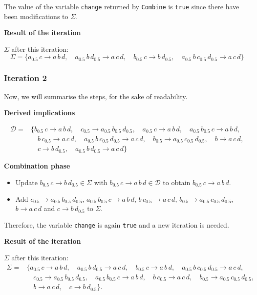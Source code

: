 \documentclass[
  letterpaper,
  DIV=11,
  numbers=noendperiod]{scrartcl}
\providecommand{\tightlist}{%
  \setlength{\itemsep}{0pt}\setlength{\parskip}{0pt}}\usepackage{longtable,booktabs,array}
\begin{document}
The value of the variable \texttt{change} returned by \texttt{Combine}
is \texttt{true} since there have been modifications to \(\Sigma\).

\textbf{Result of the iteration}

\(\Sigma\) after this iteration:
\[\Sigma = \{a_{0.5}\,c \to a\,b\,d,\quad a_{0.5}\,b\,d_{0.5} \to a\,c\,d,\quad b_{0.5}\,c \to b\,d_{0.5},\quad a_{0.5}\,b\,c_{0.5}\,d_{0.5} \to a\,c\,d\}\]

\subsubsection{Iteration 2}\label{iteration-2}

Now, we will summarise the steps, for the sake of readability.

\textbf{Derived implications}

\begin{align*}
\mathcal D = & \big\{b_{0.5}\,c \to a\,b\,d,\quad c_{0.5} \to a_{0.5}\,b_{0.5}\,d_{0.5},\quad a_{0.5}\,c \to a\,b\,d,\quad a_{0.5}\,b_{0.5}\,c \to a\,b\,d, \\
& \quad b\,c_{0.5} \to a\,c\,d,\quad a_{0.5}\,b\,c_{0.5}\,d_{0.5} \to a\,c\,d,\quad b_{0.5} \to a_{0.5}\,c_{0.5}\,d_{0.5}, \quad b \to a\,c\,d,\\
& \quad c \to b\,d_{0.5},\quad a_{0.5}\,b\,d_{0.5} \to a\,c\,d\big\}
\end{align*}

\textbf{Combination phase}

\begin{itemize}
\tightlist
\item
  Update \(b_{0.5}\,c \to b\,d_{0.5}\in\Sigma\) with
  \(b_{0.5}\,c \to a\,b\,d\in\mathcal D\) to obtain
  \(b_{0.5}\,c \to a\,b\,d\).
\item
  Add \(c_{0.5} \to a_{0.5}\,b_{0.5}\,d_{0.5}\),
  \(a_{0.5}\,b_{0.5}\,c \to a\,b\,d\), \(b\,c_{0.5} \to a\,c\,d\),
  \(b_{0.5} \to a_{0.5}\,c_{0.5}\,d_{0.5}\), \(b \to a\,c\,d\) and
  \(c \to b\,d_{0.5}\) to \(\Sigma\).
\end{itemize}

Therefore, the variable \texttt{change} is again \texttt{true} and a new
iteration is needed.

\textbf{Result of the iteration}

\(\Sigma\) after this iteration: \begin{align*}
\Sigma = & \big\{a_{0.5}\,c \to a\,b\,d,\quad a_{0.5}\,b\,d_{0.5} \to a\,c\,d,\quad b_{0.5}\,c \to a\,b\,d,\quad a_{0.5}\,b\,c_{0.5}\,d_{0.5} \to a\,c\,d,\\
& \quad c_{0.5} \to a_{0.5}\,b_{0.5}\,d_{0.5},\quad a_{0.5}\,b_{0.5}\,c \to a\,b\,d,\quad b\,c_{0.5} \to a\,c\,d,\quad b_{0.5} \to a_{0.5}\,c_{0.5}\,d_{0.5},\\
& \quad b \to a\,c\,d,\quad c \to b\,d_{0.5}\big\}.
\end{align*}
\end{document}
